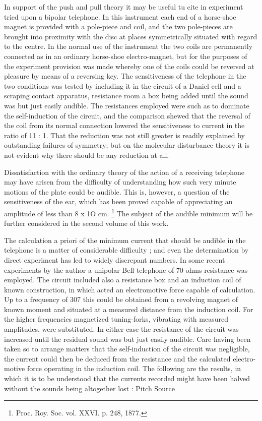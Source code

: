 In support of the  push and pull theory  it may be useful tu
cite in experiment tried upon a bipolar telephone. In this
instrument each end of a horse-shoe magnet is provided with a
pole-piece and coil, and the two pole-pieces are brought into
proximity with the disc at places symmetrically situated with
regard to the centre. In the normal use of the instrument the
two coils are permanently connected as in an ordinary horse-shoe
electro-magnet, but for the purposes of the experiment provision
was made whereby one of the coils could be reversed at pleasure
by means of a reversing key. The sensitiveness of the telephone
in the two conditions was tested by including it in the circuit of
a Daniel cell and a scraping contact apparatus, resistance room a
box being added until the sound was but just easily audible.
The resistances employed were such as to dominate the self-induction of the
circuit, and the comparison shewed that the
reversal of the coil from its normal connection lowered the sensitiveness to
current in the ratio of 11 : 1. That the reduction was
not still greater is readily explained by outstanding failures of
symmetry; but on the molecular disturbance theory it is not
evident why there should be any reduction at all.

Dissatisfaction with the ordinary theory of the action of a
receiving telephone may have arisen from the difficulty of understanding how
such very minute motions of the plate could be
audible. This is, however, a question of the sensitiveness of the
ear, which has been proved capable of appreciating an amplitude
of less than 8 x 1O cm.  \footnote{Proc. Roy. Soc. vol. XXVI. p. 248, 1877.}
The subject of the audible minimum
will be further considered in the second volume of this work.


The calculation a priori of the minimum current that should
be audible in the telephone is a matter of considerable difficulty ;
and even the determination by direct experiment has led to
widely discrepant numbers. In some recent experiments by the
author a unipolar Bell telephone of 70 ohms resistance was
employed. The circuit included also a resistance box and an
induction coil of known construction, in which acted an electromotive force
capable of calculation. Up to a frequency of 307
this could be obtained from a revolving magnet of known moment
and situated at a measured distance from the induction coil.  For
the higher frequencies magnetized tuning-forks, vibrating with
measured amplitudes, were substituted. In either case the
resistance of the circuit was increased until the residual sound
was but just easily audible. Care having been taken so to
arrange matters that the self-induction of the circuit was negligible, the
current could then be deduced from the resistance and
the calculated electro- motive force operating in the induction
coil. The following are the results, in which it is to be understood that the
currents recorded might have been halved without
the sounds being altogether lost :
Pitch Source

